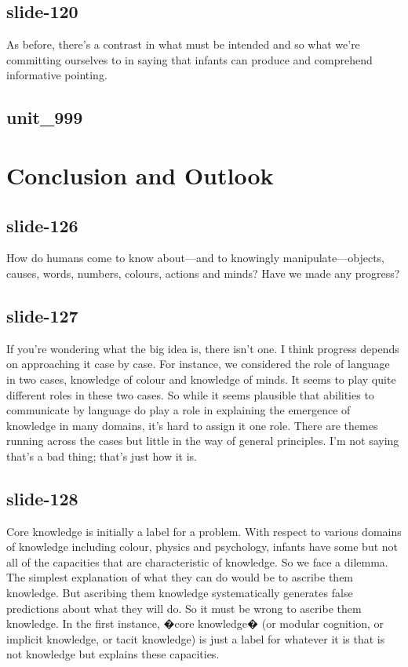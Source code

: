 \documentclass[12pt,\papersize]{extarticle}
\begin{document}
 
\subsection{slide-120}
As before, there's a contrast in what must be intended and so what we're committing ourselves to in saying that infants can produce and comprehend informative pointing.
 
 
\subsection{unit\_999}
 
\section{Conclusion and Outlook}
 
 
\subsection{slide-126}
How do humans come to know about---and to knowingly manipulate---objects, causes, words, numbers, colours, actions and minds?
Have we made any progress?
 
 
\subsection{slide-127}
If you're wondering what the big idea is, there isn't one.
I think progress depends on approaching it case by case.
For instance, we considered the role of language in two cases, knowledge of colour and knowledge of minds.
It seems to play quite different roles in these two cases.
So while it seems plausible that abilities to communicate by language do play a role in explaining the emergence of knowledge in many domains, it's hard to assign it one role.
There are themes running across the cases but little in the way of general principles.
I'm not saying that's a bad thing; that's just how it is.
 
 
\subsection{slide-128}
Core knowledge is initially a label for a problem.
With respect to various domains of knowledge including colour, physics and psychology, infants have some but not all of the capacities that are characteristic of knowledge.
So we face a dilemma.
The simplest explanation of what they can do would be to ascribe them knowledge.
But ascribing them knowledge systematically generates false predictions about what they will do.
So it must be wrong to ascribe them knowledge.
In the first instance, �core knowledge� (or modular cognition, or implicit knowledge, or tacit knowledge) is just a label for whatever it is that is not knowledge but explains these capacities.
 
\end{document}

